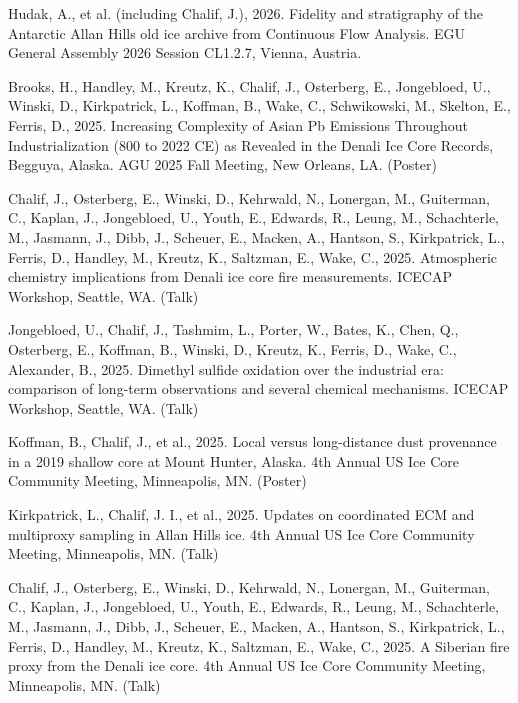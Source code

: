 \documentclass[a4paper,11pt]{article}
\begin{document}
\item[] Hudak, A., et al. (including Chalif, J.), 2026. Fidelity and stratigraphy of the Antarctic Allan Hills old ice archive from Continuous Flow Analysis. EGU General Assembly 2026 Session CL1.2.7, Vienna, Austria.

\item[\textbf{2025}] Brooks, H., Handley, M., Kreutz, K., Chalif, J., Osterberg, E., Jongebloed, U., Winski, D., Kirkpatrick, L., Koffman, B., Wake, C., Schwikowski, M., Skelton, E., Ferris, D., 2025. Increasing Complexity of Asian Pb Emissions Throughout Industrialization (800 to 2022 CE) as Revealed in the Denali Ice Core Records, Begguya, Alaska. AGU 2025 Fall Meeting, New Orleans, LA. (Poster)

\item[] Chalif, J., Osterberg, E., Winski, D., Kehrwald, N., Lonergan, M., Guiterman, C., Kaplan, J., Jongebloed, U., Youth, E., Edwards, R., Leung, M., Schachterle, M., Jasmann, J., Dibb, J., Scheuer, E., Macken, A., Hantson, S., Kirkpatrick, L., Ferris, D., Handley, M., Kreutz, K., Saltzman, E., Wake, C., 2025. Atmospheric chemistry implications from Denali ice core fire measurements. ICECAP Workshop, Seattle, WA. (Talk)

\item[] Jongebloed, U., Chalif, J., Tashmim, L., Porter, W., Bates, K., Chen, Q., Osterberg, E., Koffman, B., Winski, D., Kreutz, K., Ferris, D., Wake, C., Alexander, B., 2025. Dimethyl sulfide oxidation over the industrial era: comparison of long-term observations and several chemical mechanisms. ICECAP Workshop, Seattle, WA. (Talk)

\item[] Koffman, B., Chalif, J., et al., 2025. Local versus long-distance dust provenance in a 2019 shallow core at Mount Hunter, Alaska. 4th Annual US Ice Core Community Meeting, Minneapolis, MN. (Poster)

\item[] Kirkpatrick, L., Chalif, J. I., et al., 2025. Updates on coordinated ECM and multiproxy sampling in Allan Hills ice. 4th Annual US Ice Core Community Meeting, Minneapolis, MN. (Talk)

\item[] Chalif, J., Osterberg, E., Winski, D., Kehrwald, N., Lonergan, M., Guiterman, C., Kaplan, J., Jongebloed, U., Youth, E., Edwards, R., Leung, M., Schachterle, M., Jasmann, J., Dibb, J., Scheuer, E., Macken, A., Hantson, S., Kirkpatrick, L., Ferris, D., Handley, M., Kreutz, K., Saltzman, E., Wake, C., 2025. A Siberian fire proxy from the Denali ice core. 4th Annual US Ice Core Community Meeting, Minneapolis, MN. (Talk)
\end{document}
